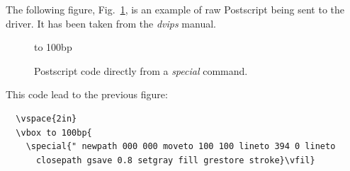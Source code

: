 \documentclass[a4paper, 11pt]{article}
\begin{document}
The following figure, Fig.~\ref{figf7}, is an example of raw
Postscript being sent to the driver.  It has been taken from the
{\em dvips} manual.

\begin{figure}[h]
  \vspace{2in}
  \vbox to 100bp{
    \vfil}
  \caption{Postscript code directly from a {\em special} command.}
  \label{figf7}
\end{figure}  

\noindent
This code lead to the previous figure:

\begin{verbatim}
  \vspace{2in}
  \vbox to 100bp{
    \special{" newpath 000 000 moveto 100 100 lineto 394 0 lineto
      closepath gsave 0.8 setgray fill grestore stroke}\vfil}
\end{verbatim}
\newpage
\end{document}
